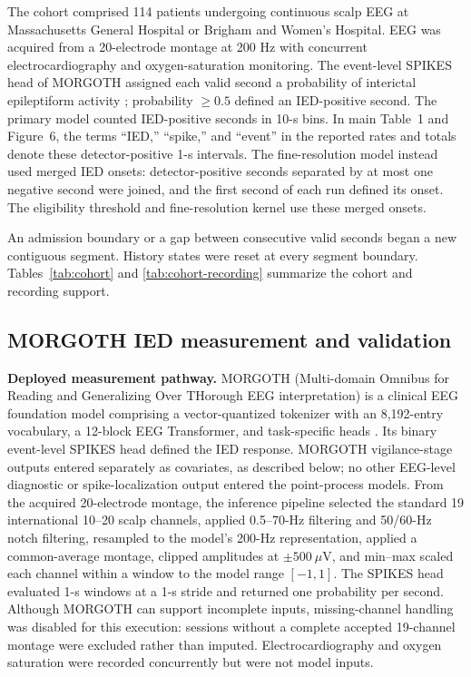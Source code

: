 \documentclass[11pt]{article}
\begin{document}
The cohort comprised 114 patients undergoing continuous scalp EEG at Massachusetts General Hospital or Brigham and Women's Hospital. EEG was acquired from a 20-electrode montage at 200 Hz with concurrent electrocardiography and oxygen-saturation monitoring. The event-level SPIKES head of MORGOTH assigned each valid second a probability of interictal epileptiform activity \cite{MORGOTHValidation2026,MORGOTH2026}; probability $\geq0.5$ defined an IED-positive second. The primary model counted IED-positive seconds in 10-s bins. In main Table~1 and Figure~6, the terms ``IED,'' ``spike,'' and ``event'' in the reported rates and totals denote these detector-positive 1-s intervals. The fine-resolution model instead used merged IED onsets: detector-positive seconds separated by at most one negative second were joined, and the first second of each run defined its onset. The eligibility threshold and fine-resolution kernel use these merged onsets.

An admission boundary or a gap between consecutive valid seconds began a new contiguous segment. History states were reset at every segment boundary. Tables~\ref{tab:cohort} and \ref{tab:cohort-recording} summarize the cohort and recording support.

\subsection*{MORGOTH IED measurement and validation}

\textbf{Deployed measurement pathway.} MORGOTH (Multi-domain Omnibus for Reading and Generalizing Over THorough EEG interpretation) is a clinical EEG foundation model comprising a vector-quantized tokenizer with an 8,192-entry vocabulary, a 12-block EEG Transformer, and task-specific heads \cite{MORGOTHValidation2026,MORGOTH2026}. Its binary event-level SPIKES head defined the IED response. MORGOTH vigilance-stage outputs entered separately as covariates, as described below; no other EEG-level diagnostic or spike-localization output entered the point-process models. From the acquired 20-electrode montage, the inference pipeline selected the standard 19 international 10--20 scalp channels, applied 0.5--70-Hz filtering and 50/60-Hz notch filtering, resampled to the model's 200-Hz representation, applied a common-average montage, clipped amplitudes at $\pm500~\mu$V, and min--max scaled each channel within a window to the model range $[-1,1]$. The SPIKES head evaluated 1-s windows at a 1-s stride and returned one probability per second. Although MORGOTH can support incomplete inputs, missing-channel handling was disabled for this execution: sessions without a complete accepted 19-channel montage were excluded rather than imputed. Electrocardiography and oxygen saturation were recorded concurrently but were not model inputs.
\end{document}
